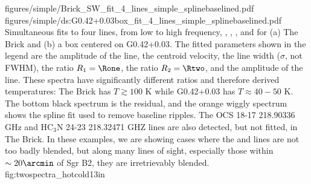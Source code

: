 \FigureTwo
{figures/simple/Brick_SW_fit_4_lines_simple_splinebaselined.pdf}
{figures/simple/ds:G0.42+0.03box_fit_4_lines_simple_splinebaselined.pdf}
{
Simultaneous fits to four lines, from low to high frequency, \para
\threeohthree, \methanol \fourtwotwo, \para \threetwotwo, and \para \threetwoone
for (a) The Brick and (b) a box centered on G0.42+0.03.  The fitted parameters
shown in the legend are the amplitude of the \formaldehyde \threeohthree line,
the centroid velocity, the line width ($\sigma$, not FWHM), the ratio $R_1 =
\Rone$, the ratio $R_2 = \Rtwo$, and the amplitude of the \methanol \fourtwotwo
line.  These spectra have significantly different ratios and therefore derived
temperatures: The Brick has $T\gtrsim100$ K while G0.42+0.03 has
$T\approx40-50$ K.  The bottom black spectrum is the residual, and the orange
wiggly spectrum shows the spline fit used to remove baseline ripples.
The OCS 18-17 218.90336 GHz and HC$_3$N 24-23 218.32471 GHZ lines are also
detected, but not fitted, in The Brick.
In these examples, we are showing cases where the \methanol \fourtwotwo and
\para \threetwotwo lines are not too badly blended, but along many lines of
sight, especially those within $\sim20\arcmin$ of Sgr B2, they are
irretrievably blended.
}
{fig:twospectra_hotcold}{1}{3in}


